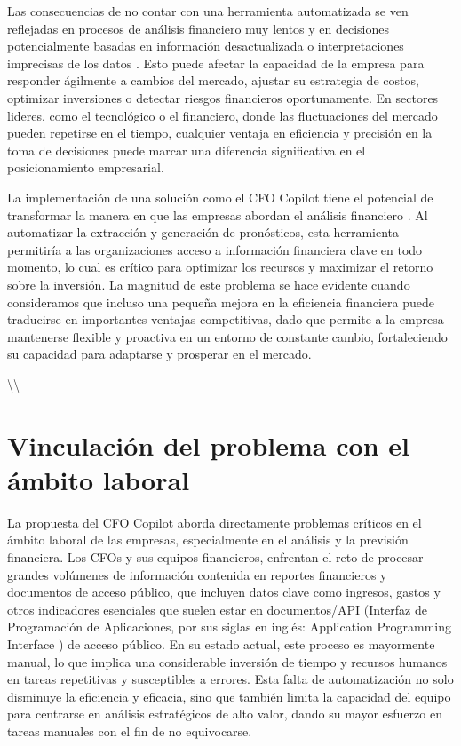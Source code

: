 \documentclass[12pt,letterpaper,oneside]{report}
\renewcommand{\_}{\UnderscoreOriginal\allowbreak}
\begin{document}
Las consecuencias de no contar con una herramienta automatizada se ven reflejadas en procesos de análisis financiero muy lentos y en decisiones potencialmente basadas en información desactualizada o interpretaciones imprecisas de los datos \parencite{PastranaBonilla2023}. Esto puede afectar la capacidad de la empresa para responder ágilmente a cambios del mercado, ajustar su estrategia de costos, optimizar inversiones o detectar riesgos financieros oportunamente. En sectores lideres, como el tecnológico o el financiero, donde las fluctuaciones del mercado pueden repetirse en el tiempo, cualquier ventaja en eficiencia y precisión en la toma de decisiones puede marcar una diferencia significativa en el posicionamiento empresarial.

La implementación de una solución como el CFO Copilot tiene el potencial de transformar la manera en que las empresas abordan el análisis financiero \parencite{Cuervo2023}. Al automatizar la extracción y generación de pronósticos, esta herramienta permitiría a las organizaciones acceso a información financiera clave en todo momento, lo cual es crítico para optimizar los recursos y maximizar el retorno sobre la inversión. La magnitud de este problema se hace evidente cuando consideramos que incluso una pequeña mejora en la eficiencia financiera puede traducirse en importantes ventajas competitivas, dado que permite a la empresa mantenerse flexible y proactiva en un entorno de constante cambio, fortaleciendo su capacidad para adaptarse y prosperar en el mercado.

\textbackslash{}\textbackslash{}

\section{Vinculación del problema con el ámbito laboral}
La propuesta del CFO Copilot aborda directamente problemas críticos en el ámbito laboral de las empresas, especialmente en el análisis y la previsión financiera. Los CFOs y sus equipos financieros, enfrentan el reto de procesar grandes volúmenes de información contenida en reportes financieros y documentos de acceso público, que incluyen datos clave como ingresos, gastos y otros indicadores esenciales que suelen estar en documentos/API (Interfaz de Programación de Aplicaciones, por sus siglas en inglés: Application Programming Interface \parencite{Fielding2000}) de acceso público. En su estado actual, este proceso es mayormente manual, lo que implica una considerable inversión de tiempo y recursos humanos en tareas repetitivas y susceptibles a errores. Esta falta de automatización no solo disminuye la eficiencia y eficacia, sino que también limita la capacidad del equipo para centrarse en análisis estratégicos de alto valor, dando su mayor esfuerzo en tareas manuales con el fin de no equivocarse.
\end{document}
